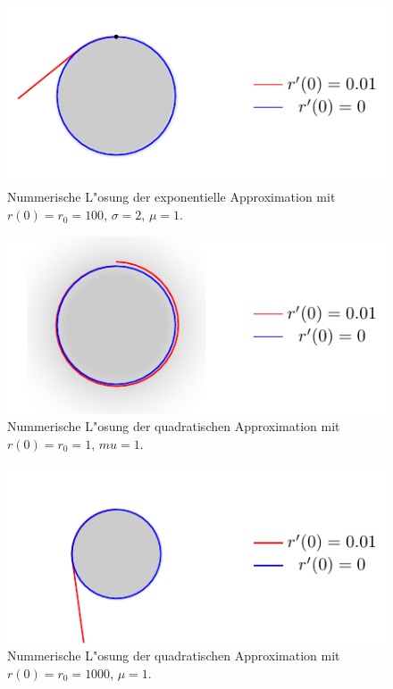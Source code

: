 \begin{refsection}
\begin{figure}
\end{figure}

\begin{figure}
  \centering
  \includegraphics[scale=1]{licht/standalone/fig_kreis_exp2.pdf}
  \caption{Nummerische L"osung der exponentielle Approximation mit $r(0) = r_0 = 100$, $\sigma = 2$, $\mu = 1$. \label{fig:sphere_special2}} 
  
\end{figure}

\begin{figure}
  \centering
  \includegraphics[scale=1]{licht/standalone/fig_kreis_square1.pdf}
  \caption{Nummerische L"osung der quadratischen Approximation mit $r(0) = r_0 = 1$, $mu = 1$. \label{fig:sphere_special3} }
  
\end{figure}

\begin{figure}
  \centering
  \includegraphics[scale=1]{licht/standalone/fig_kreis_square2.pdf}
  \caption{Nummerische L"osung der quadratischen Approximation mit $r(0) = r_0 = 1000$,  $\mu = 1$. \label{fig:sphere_special4} } 
\end{figure}


\end{refsection}
